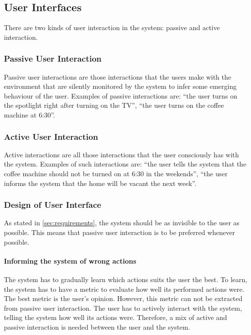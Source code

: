 \subsection{User Interfaces}
There are two kinds of user interaction in the system: passive and active interaction.

\subsubsection{Passive User Interaction}
Passive user interactions are those interactions that the users make with the environment that are silently monitored by the system to infer some emerging behaviour of the user. Examples of passive interactions are: \enquote{the user turns on the spotlight right after turning on the TV}, \enquote{the user turns on the coffee machine at 6:30}.

\subsubsection{Active User Interaction}
Active interactions are all those interactions that the user consciously has with the system. Examples of such interactions are: \enquote{the user tells the system that the coffee machine should not be turned on at 6:30 in the weekends}, \enquote{the user informs the system that the home will be vacant the next week}.

\subsubsection{Design of User Interface}
As stated in \cref{sec:requirements}, the system should be as invisible to the user as possible. This means that passive user interaction is to be preferred whenever possible. 

\paragraph{Informing the system of wrong actions}

The system has to gradually learn which actions suits the user the best. To learn, the system has to have a metric to evaluate how well its performed actions were. The best metric is the user's opinion. However, this metric can not be extracted from passive user interaction. The user has to actively interact with the system, telling the system how well its actions were. Therefore, a mix of active and passive interaction is needed between the user and the system.

